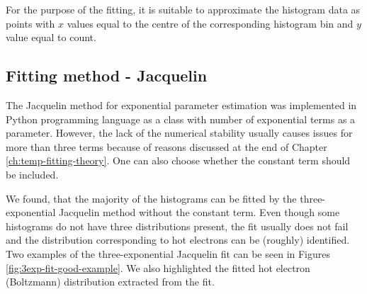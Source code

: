 For the purpose of the fitting, it is suitable to approximate the histogram data as points with $x$ values equal to the centre of the corresponding histogram bin and $y$ value equal to count.

\subsection*{Fitting method - Jacquelin}

The Jacquelin method for exponential parameter estimation was implemented in Python programming language as a class with number of exponential terms as a parameter. However, the lack of the numerical stability usually causes issues for more than three terms because of reasons discussed at the end of Chapter \ref{ch:temp-fitting-theory}. One can also choose whether the constant term should be included.

We found, that the majority of the histograms can be fitted by the three-exponential Jacquelin method without the constant term. Even though some histograms do not have three distributions present, the fit usually does not fail and the distribution corresponding to hot electrons can be (roughly) identified. Two examples of the three-exponential Jacquelin fit can be seen in Figures \ref{fig:3exp-fit-good-example}. We also highlighted the fitted hot electron (Boltzmann) distribution extracted from the fit.

